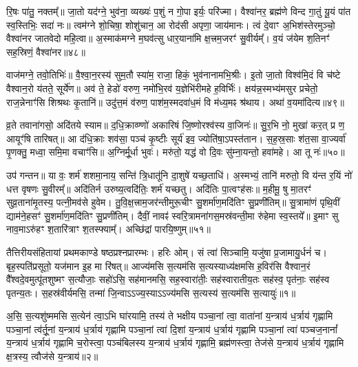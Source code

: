 रि॒षः पा॑तु॒ नक्तम्᳚॥ जा॒तो यद॑ग्ने॒ भुव॑ना॒ व्यख्यः॑ प॒शुं न गो॒पा इर्यः॒ परि॑ज्मा। वैश्वा॑नर॒ ब्रह्म॑णे विन्द गा॒तुं यू॒यं पा॑त स्व॒स्तिभिः॒ सदा॑ नः॥ त्वम॑ग्ने शो॒चिषा॒ शोशु॑चान॒ आ रोद॑सी अपृणा॒ जाय॑मानः। त्वं दे॒वाꣳ अ॒भिश॑स्तेरमुञ्चो॒ वैश्वा॑नर जातवेदो महि॒त्वा॥ अ॒स्माक॑मग्ने म॒घव॑त्सु धार॒याना॑मि क्ष॒त्त्रम॒जरꣳ॑ सु॒वीर्यम्᳚। व॒यं ज॑येम श॒तिनꣳ॑ सह॒स्रिणं॒ वैश्वा॑नर॥४८॥

वाज॑मग्ने॒ तवो॒तिभिः॑॥ वै॒श्वा॒न॒रस्य॑ सुम॒तौ स्या॑म॒ राजा॒ हिकं॒ भुव॑नानामभि॒श्रीः। इ॒तो जा॒तो विश्व॑मि॒दं वि च॑ष्टे वैश्वान॒रो य॑तते॒ सूर्ये॑ण॥ अव॑ ते॒ हेडो॑ वरुण॒ नमो॑भि॒रव॑ य॒ज्ञेभि॑रीमहे ह॒विर्भिः॑। क्षय॑न्न॒स्मभ्य॑मसुर प्रचेतो॒ राज॒न्नेनाꣳ॑सि शिश्रथः कृ॒तानि॑॥ उदु॑त्त॒मं व॑रुण॒ पाश॑म॒स्मदवा॑ध॒मं वि म॑ध्य॒मꣴ श्र॑थाय। अथा॑ व॒यमा॑दित्य॥४९॥

व्र॒ते तवाना॑गसो॒ अदि॑तये स्याम॥ द॒धि॒क्राव्ण्णो॑ अकारिषं जि॒ष्णोरश्व॑स्य वा॒जिनः॑॥ सु॒र॒भि नो॒ मुखा॑ कर॒त् प्र ण॒ आयूꣳ॑षि तारिषत्॥ आ द॑धि॒क्राः शव॑सा॒ पञ्च॑ कृ॒ष्टीः सूर्य॑ इव॒ ज्योति॑षा॒\-ऽपस्त॑तान। स॒ह॒स्र॒साः श॑त॒सा वा॒ज्यर्वा॑ पृ॒णक्तु॒ मध्वा॒ समि॒मा वचाꣳ॑सि॥ अ॒ग्निर्मू॒र्धा भुवः॑। मरु॑तो॒ यद्ध॑ वो दि॒वः सु॑म्ना॒यन्तो॒ हवा॑महे। आ तू नः॑॥५०॥

उप॑ गन्तन॥ या वः॒ शर्म॑ शशमा॒नाय॒ सन्ति॑ त्रि॒धातू॑नि दा॒शुषे॑ यच्छ॒ताधि॑। अ॒स्मभ्यं॒ तानि॑ मरुतो॒ वि य॑न्त र॒यिं नो॑ धत्त वृषणः सु॒वीरम्᳚॥ अदि॑तिर्न उरुष्य॒त्वदि॑तिः॒ शर्म॑ यच्छतु। अदि॑तिः पा॒त्वꣳह॑सः॥ म॒हीमू॒ षु मा॒तरꣳ॑ सुव्र॒ताना॑मृ॒तस्य॒ पत्नी॒मव॑से हुवेम। तु॒वि॒क्ष॒त्त्राम॒जर॑न्तीमुरू॒चीꣳ सु॒शर्मा॑ण॒मदि॑तिꣳ सु॒प्रणी॑तिम्॥ सु॒त्रामा॑णं पृथि॒वीं द्याम॑ने॒हसꣳ॑ सु॒शर्मा॑ण॒मदि॑तिꣳ सु॒प्रणी॑तिम्। दैवीं॒ नावꣴ॑ स्वरि॒त्रामना॑गस॒मस्र॑वन्ती॒मा रु॑हेमा स्व॒स्तये᳚॥ इ॒माꣳ सु नाव॒मा\-ऽरु॑हꣳ श॒तारि॑त्राꣳ श॒तस्फ्याम्᳚। अच्छि॑द्रां पारयि॒ष्णुम्॥५१॥

{\anuvakamend[{दिवा॒ स स॑ह॒स्रिणं॒ वैश्वा॑नरा\-ऽ\-ऽदित्य॒ तू नो॑\-ऽने॒हसꣳ॑ सु॒शर्मा॑ण॒मेका॒न्नविꣳ॑श॒तिश्च॑॥11॥}]}

\setcounter{anuvakam}{0}
तैत्तिरीयसंहितायां प्रथमकाण्डे षष्ठप्रश्नप्रारम्भः। हरिः ओम्। सं त्वा॑ सिञ्चामि॒ यजु॑षा प्र॒जामायु॒र्धनं॑ च। बृह॒स्पति॑प्रसूतो॒ यज॑मान इ॒ह मा रि॑षत्॥ आज्य॑मसि स॒त्यम॑सि स॒त्यस्याध्य॑क्षमसि ह॒विर॑सि वैश्वान॒रं वै᳚श्वदे॒वमुत्पू॑तशुष्मꣳ स॒त्यौजाः॒ सहो॑\-ऽसि॒ सह॑मानमसि॒ सह॒स्वारा॑तीः॒ सह॑स्वारातीय॒तः सह॑स्व॒ पृत॑नाः॒ सह॑स्व पृतन्य॒तः। स॒हस्र॑वीर्यमसि॒ तन्मा॑ जि॒न्वा\-ऽ\-ऽज्य॒स्या\-ऽ\-ऽज्य॑मसि स॒त्यस्य॑ स॒त्यम॑सि स॒त्यायुः॑॥१॥

अ॒सि॒ स॒त्यशु॑ष्ममसि स॒त्येन॑ त्वा॒\-ऽभि घा॑रयामि॒ तस्य॑ ते भक्षीय पञ्चा॒नां त्वा॒ वाता॑नां य॒न्त्राय॑ ध॒र्त्राय॑ गृह्णामि पञ्चा॒नां त्व॑र्तू॒नां य॒न्त्राय॑ ध॒र्त्राय॑ गृह्णामि पञ्चा॒नां त्वा॑ दि॒शां य॒न्त्राय॑ ध॒र्त्राय॑ गृह्णामि पञ्चा॒नां त्वा॑ पञ्चज॒नानां᳚ य॒न्त्राय॑ ध॒र्त्राय॑ गृह्णामि च॒रोस्त्वा॒ पञ्च॑बिलस्य य॒न्त्राय॑ ध॒र्त्राय॑ गृह्णामि॒ ब्रह्म॑णस्त्वा॒ तेज॑से य॒न्त्राय॑ ध॒र्त्राय॑ गृह्णामि क्ष॒त्रस्य॒ त्वौज॑से य॒न्त्राय॑॥२॥

